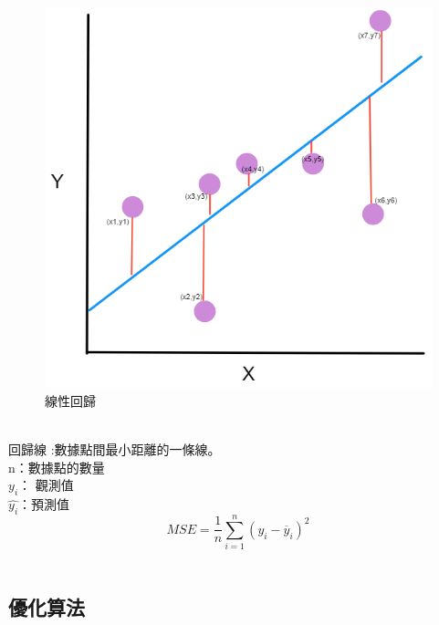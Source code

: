 \documentclass[14pt,a4paper]{report}  %
\begin{document}
\begin{itemize}
\begin{figure}
\begin{center}
\includegraphics[scale=0.6]{MSE}
\caption{\Large 線性回歸}\label{線性回歸}
\end{center}
\end{figure}
\\
回歸線 :數據點間最小距離的一條線。 \\
n：數據點的數量\\
$y_i$： 觀測值\\
$\hat{y_i}$：預測值\\
$$MSE=\frac{1}{n} \sum_{i=1}^n(y_i-\overline{y} _i)^2$$\\
\end{itemize}

\subsection{優化算法}
\newpage
\end{document}
